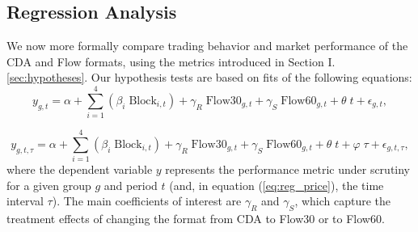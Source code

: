 \documentclass[12pt]{article}
\begin{document}

\subsection{Regression Analysis}\label{sect:RegResults}

We now more formally compare  trading behavior and market performance of the CDA and Flow formats, using the metrics introduced in Section I.\ref{sec:hypotheses}.
Our hypothesis tests %
are based on fits of the following equations: 
\begin{equation} \label{eq:reg}
    y_{g,t} = \alpha + \sum^{4}_{i = 1} \left(\beta_i \; \text{Block}_{i,t} \right) + \gamma_R \; \text{Flow30}_{g,t}+ \gamma_S \; \text{Flow60}_{g,t} + \theta \; t + \epsilon_{g,t},
\end{equation}

\begin{equation} \label{eq:reg_price}
    y_{g,t,\tau} = \alpha + \sum^{4}_{i = 1} \left(\beta_i \; \text{Block}_{i,t}\right) + \gamma_R \; \text{Flow30}_{g,t} + \gamma_S \; \text{Flow60}_{g,t}+ \theta \; t + \varphi \; \tau + \epsilon_{g,t, \tau}, 
\end{equation}
where the dependent variable $y$ represents the performance metric under scrutiny for a given group $g$ and period $t$ (and, in equation (\ref{eq:reg_price}), the time interval $\tau$). 
The main coefficients of interest are $\gamma_R$ and $\gamma_S$, which capture the treatment effects of changing the format from CDA to Flow30 or to Flow60.
\end{document}

